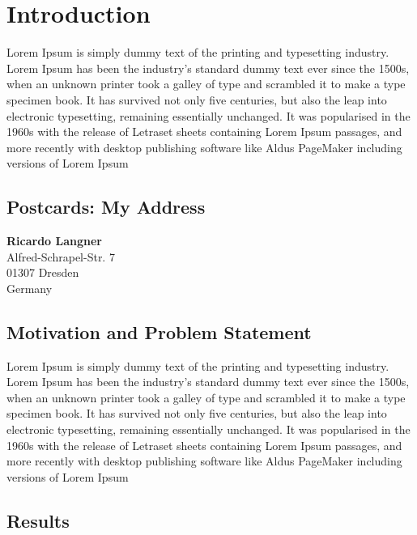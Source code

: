%
\chapter{Introduction}
\label{sec:intro}


Lorem Ipsum is simply dummy text of the printing and typesetting industry. Lorem Ipsum has been the industry's standard dummy text ever since the 1500s, when an unknown printer took a galley of type and scrambled it to make a type specimen book. It has survived not only five centuries, but also the leap into electronic typesetting, remaining essentially unchanged. It was popularised in the 1960s with the release of Letraset sheets containing Lorem Ipsum passages, and more recently with desktop publishing software like Aldus PageMaker including versions of Lorem Ipsum

\section{Postcards: My Address}
\label{sec:intro:address}

\textbf{Ricardo Langner} \\
Alfred-Schrapel-Str. 7 \\
01307 Dresden \\
Germany


\section{Motivation and Problem Statement}
\label{sec:intro:motivation}

Lorem Ipsum is simply dummy text of the printing and typesetting industry. Lorem Ipsum has been the industry's standard dummy text ever since the 1500s, when an unknown printer took a galley of type and scrambled it to make a type specimen book. It has survived not only five centuries, but also the leap into electronic typesetting, remaining essentially unchanged. It was popularised in the 1960s with the release of Letraset sheets containing Lorem Ipsum passages, and more recently with desktop publishing software like Aldus PageMaker including versions of Lorem Ipsum

\section{Results}
\label{sec:intro:results}

